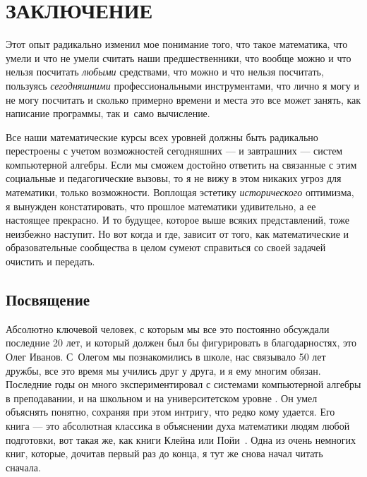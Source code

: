 \documentclass[intlimits,twoside,a4paper,11pt]{article}
\begin{document}
		\section{ЗАКЛЮЧЕНИЕ}
		
		
		Этот опыт радикально изменил мое понимание того, что такое математика, что умели и 
		что не умели считать наши предшественники, что вообще можно и что нельзя
		посчитать {\it любыми\/} средствами, что можно и что нельзя посчитать, пользуясь 
		{\it сегодняшними\/} профессиональными инструментами, что лично я могу и не могу 
		посчитать и сколько примерно времени и места это все может занять, как написание 
		программы, так и~само вычисление.
		
		Все наши математические курсы всех уровней должны быть радикально 
		перестроены с учетом возможностей сегодняшних --- и завтрашних --- систем 
		компьютерной алгебры. Если мы сможем достойно ответить на связанные с
		этим социальные и педагогические вызовы, то я не вижу в этом никаких угроз
		для математики, только возможности. Воплощая эстетику {\it исторического\/} 
		оптимизма, я вынужден констатировать, что прошлое математики 
		удивительно, а ее настоящее прекрасно. И то  будущее, которое выше всяких 
		представлений, тоже неизбежно наступит. Но вот когда и где, зависит от того, 
		как математические и образовательные сообщества в целом сумеют справиться 
		со своей задачей очистить и передать.
		
		
		\subsection{Посвящение} Абсолютно ключевой человек, с которым мы все это 
		постоянно обсуждали последние 20 лет, и который должен был
		бы фигурировать в благодарностях, это Олег Иванов. С~Олегом мы 
		познакомились в школе, нас связывало 50 лет дружбы, все это время мы учились 
		друг у друга, и я ему многим обязан. Последние годы он много экспериментировал 
		с системами компьютерной алгебры в преподавании, и на школьном \cite{I1, I2, I3,
			I4, I5, I6} и
		на университетском уровне \cite{VILH, Iv, IF}.
		Он умел объяснять понятно, сохраняя при 
		этом интригу, что редко кому удается. Его книга \cite{I} --- это абсолютная классика 
		в объяснении духа математики людям любой подготовки, вот такая же, как книги 
		Клейна \cite{Kl} или Пойи~\cite{P}. Одна из очень немногих книг, которые, дочитав 
		первый раз до конца, я тут же снова начал читать сначала.
		
\end{document}
